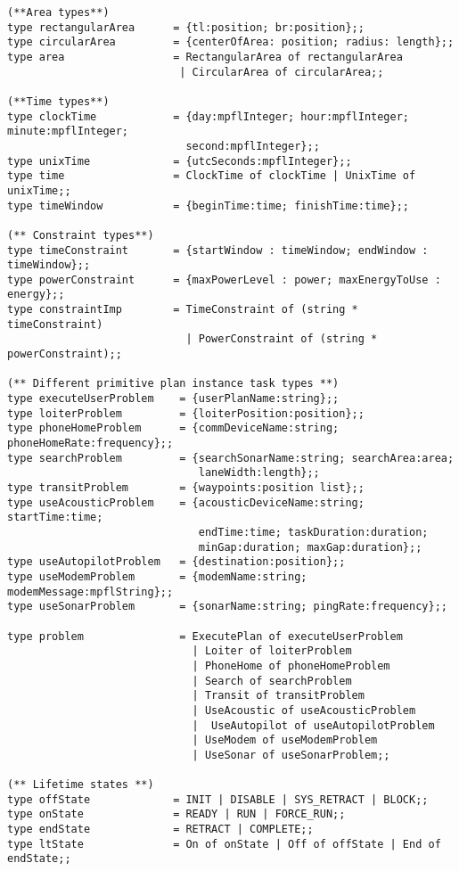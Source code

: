 \begin{verbatim}
(**Area types**)
type rectangularArea      = {tl:position; br:position};;
type circularArea         = {centerOfArea: position; radius: length};;
type area                 = RectangularArea of rectangularArea 
                           | CircularArea of circularArea;;
                           
(**Time types**)
type clockTime            = {day:mpflInteger; hour:mpflInteger; minute:mpflInteger;
                            second:mpflInteger};;
type unixTime             = {utcSeconds:mpflInteger};;
type time                 = ClockTime of clockTime | UnixTime of unixTime;;
type timeWindow           = {beginTime:time; finishTime:time};;

(** Constraint types**)
type timeConstraint       = {startWindow : timeWindow; endWindow : timeWindow};;
type powerConstraint      = {maxPowerLevel : power; maxEnergyToUse : energy};;
type constraintImp        = TimeConstraint of (string * timeConstraint) 
                            | PowerConstraint of (string * powerConstraint);;

(** Different primitive plan instance task types **)
type executeUserProblem    = {userPlanName:string};;
type loiterProblem         = {loiterPosition:position};;
type phoneHomeProblem      = {commDeviceName:string; phoneHomeRate:frequency};;
type searchProblem         = {searchSonarName:string; searchArea:area;
                              laneWidth:length};;
type transitProblem        = {waypoints:position list};;
type useAcousticProblem    = {acousticDeviceName:string; startTime:time;
                              endTime:time; taskDuration:duration;
                              minGap:duration; maxGap:duration};;
type useAutopilotProblem   = {destination:position};;
type useModemProblem       = {modemName:string; modemMessage:mpflString};;
type useSonarProblem       = {sonarName:string; pingRate:frequency};;
 
type problem               = ExecutePlan of executeUserProblem 
                             | Loiter of loiterProblem 
                             | PhoneHome of phoneHomeProblem 
                             | Search of searchProblem 
                             | Transit of transitProblem 
                             | UseAcoustic of useAcousticProblem 
                             |  UseAutopilot of useAutopilotProblem 
                             | UseModem of useModemProblem
                             | UseSonar of useSonarProblem;;

(** Lifetime states **)
type offState             = INIT | DISABLE | SYS_RETRACT | BLOCK;;
type onState              = READY | RUN | FORCE_RUN;;
type endState             = RETRACT | COMPLETE;;
type ltState              = On of onState | Off of offState | End of endState;; 


\end{verbatim}
